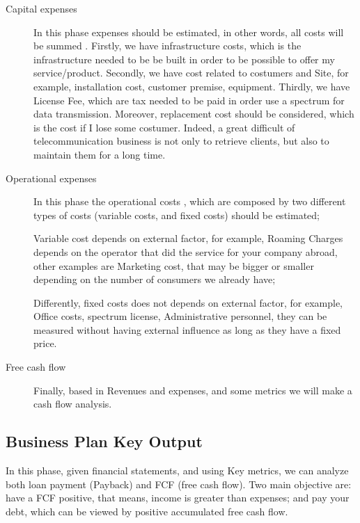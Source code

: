 \documentclass[a4paper,11pt]{article}
\begin{document}
\begin{description}
\item[Capital expenses]  In this phase expenses should be estimated, in other
  words, all  costs will be summed . Firstly, we  have {\color{purple}infrastructure
    costs},  which is the  infrastructure needed to be  be built  in order  to be
  possible  to offer  my  service/product.  Secondly, we  have  cost related  to
  costumers  and   Site,  for   example,  installation  cost,   customer  premise,
  equipment. Thirdly, we  have License Fee, which are tax needed  to be paid in  order use  a spectrum  for data transmission.  Moreover,   replacement cost  should be considered, which  is the cost if I lose some  costumer. Indeed, a great   difficult of telecommunication  business is not only to  retrieve clients, but
  also to maintain them for a long time.


\item[Operational expenses] 
In  this  phase  the  operational
  costs , which are composed by two different types of costs (variable costs, and  fixed costs) should be estimated;

  Variable  cost  depends  on  external  factor, for  example,  Roaming  Charges
  depends on the  operator that did the service for  your company abroad, other
  examples are  Marketing cost, that may  be bigger or smaller  depending on the number of consumers we already have;

  Differently, fixed costs does not depends on external factor, for example, Office costs, spectrum license,  Administrative  personnel,  they  can  be  measured  without  having  external influence as long as they have a fixed price.

\item[Free cash flow] Finally, based  in Revenues and expenses, and some metrics
  we will make a cash flow analysis.

\end{description}

\subsection{Business Plan Key Output}

In this phase, given financial statements, and using Key metrics, we can analyze
both loan payment (Payback)  and FCF (free cash flow).
Two main objective are: have a  FCF positive, that means, income is greater  than expenses; and pay your debt, which can be viewed by positive accumulated free cash flow.
\end{document}
